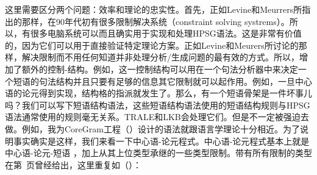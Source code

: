 这里需要区分两个问题：效率和理论的忠实性。首先，正如Levine和Meurrers所指出的那样，在90年代初有很多限制解决系统（constraint solving systrems）。所以，有很多电脑系统可以而且确实用于实现和处理HPSG语法。这是非常有价值的，因为它们可以用于直接验证特定理论方案。正如Levine和Meurers所讨论的那样，解决限制而不用任何知道并非处理分析/生成问题的最有效的方式。所以，增加了额外的控制-结构。例如，这一控制结构可以用在一个句法分析器中来决定一个短语的句法结构并且只要有足够的信息其它限制就可以起作用。例如，一旦中心语的论元得到实现，结构格的指派就发生了。那么，有一个短语骨架是一件坏事儿吗？我们可以写下短语结构语法，这些短语结构语法使用的短语结构规则与HPSG语法通常使用的规则毫无关系。TRALE\citep*{MPR2002a-u,Penn2004a-u}和LKB会处理它们。但是不一定被强迫去做。例如，我为CoreGram工程（\citep{MuellerCoreGramBrief,MuellerCoreGram}）设计的语法就跟语言学理论十分相近。为了说明事实确实是这样，我们来看一下中心语-论元程式。中心语-论元程式基本上就是中心语-论元-短语 ，加上从其上位类型承继的一些类型限制。带有所有限制的类型在第~\pageref{head-arg-schema-hfp}页曾经给出，这里重复如（）：
